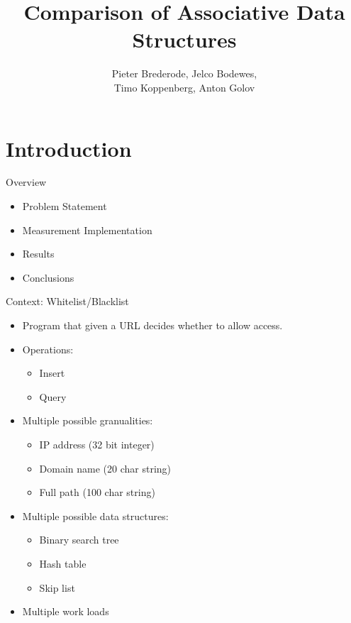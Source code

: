 \documentclass[10pt]{beamer}
\title{Comparison of Associative Data Structures}
\author{Pieter Brederode, Jelco Bodewes, \\ Timo Koppenberg, Anton Golov}
\institute{B3OMI}
\begin{document}
\begin{frame}
    \maketitle
\end{frame}


\section{Introduction}
\begin{frame}{Overview}
    \begin{itemize}
        \item Problem Statement
        \item Measurement Implementation
        \item Results
        \item Conclusions
    \end{itemize}
\end{frame}

\begin{frame}{Context: Whitelist/Blacklist}
    \begin{itemize}
        \item Program that given a URL decides whether to allow access.
        \item Operations:
        \begin{itemize}
            \item Insert
            \item Query
        \end{itemize}
        \item Multiple possible granualities:
        \begin{itemize}
            \item IP address (32 bit integer)
            \item Domain name (20 char string)
            \item Full path (100 char string)
        \end{itemize}
        \item Multiple possible data structures:
        \begin{itemize}
            \item Binary search tree
            \item Hash table
            \item Skip list
        \end{itemize}
        \item Multiple work loads
    \end{itemize}
\end{frame}
\end{document}
